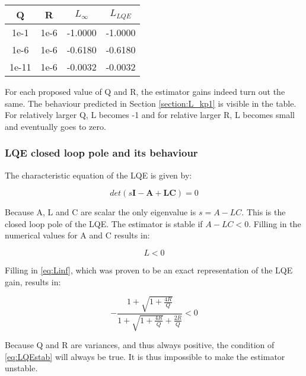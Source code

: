 \documentclass[a4paper]{article}
\newcommand{\newpar}{\vspace{.3cm}\noindent}
\begin{document}
\begin{center}
    \begin{tabular}{ |c|c|c|c|}
    \hline
     Q & R & \(L_{\infty}\) & \(L_{LQE}\) \\
    \hline
    1e-1 & 1e-6 & -1.0000 & -1.0000 \\
    \hline
    1e-6 & 1e-6 & -0.6180 & -0.6180 \\
    \hline
    1e-11 & 1e-6 & -0.0032 & -0.0032 \\
    \hline
    \end{tabular}  
    \label{tab:LinfLlqe}
\end{center}

\newpar
For each proposed value of Q and R, the estimator gains indeed turn out the same. The behaviour predicted in Section \ref{section:L_kp1} is visible in the table. For relatively larger Q, L becomes -1 and for relative larger R, L becomes small and eventually goes to zero.

\subsubsection{LQE closed loop pole and its behaviour}

The characteristic equation of the LQE is given by:

\begin{equation}
    det\left(s\textbf{I}-\textbf{A}+\textbf{LC}\right) = 0
\end{equation}

\newpar
Because A, L and C are scalar the only eigenvalue is \(s = A-LC\). This is the closed loop pole of the LQE. The estimator is stable if \(A-LC < 0\). Filling in the numerical values for A and C results in:

\begin{equation}
    L < 0
\end{equation}

\newpar
Filling in \autoref{eq:Linf}, which was proven to be an exact representation of the LQE gain, results in:

\begin{equation}
    -\frac{1+\sqrt{1+\frac{4R}{Q}}}{1+\sqrt{1+\frac{4R}{Q}}+\frac{2R}{Q}} < 0
    \label{eq:LQEstab}
\end{equation}

\newpar
Because Q and R are variances, and thus always positive, the condition of \autoref{eq:LQEstab} will always be true. It is thus impossible to make the estimator unstable.
\end{document}
